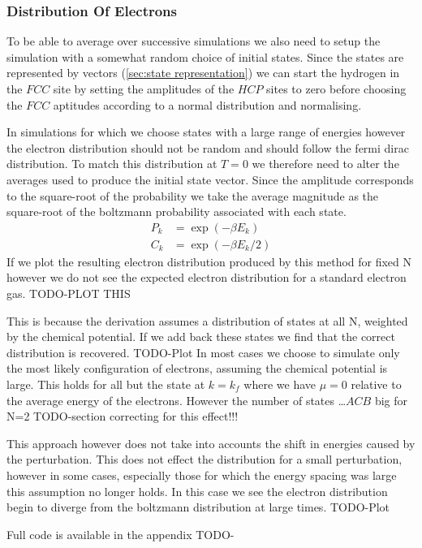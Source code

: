\subsubsection{Distribution Of Electrons}
To be able to average over successive
simulations we also need to setup the
simulation with a somewhat random
choice of initial states. Since the states
are represented by vectors (\cref{sec:state representation})
we can start the hydrogen
in the \(FCC\) site by setting the
amplitudes of the \(HCP\) sites to zero
before choosing the \(FCC\) aptitudes according to
a normal distribution and normalising.

In simulations for which we choose states
with a large range of energies however
the electron distribution should not be
random and should follow the fermi dirac distribution.
To match this distribution at \(T=0\) we therefore
need to alter the averages used
to produce the initial state vector.
Since the amplitude corresponds to
the square-root of the probability we
take the average magnitude as the
square-root of the boltzmann probability
associated with each state.
\begin{align}
    P_k & = \exp(-\beta{}E_k)     \\
    C_k & = \exp(-\beta{}E_k / 2)
\end{align}
If we plot the resulting
electron distribution produced
by this method for fixed N however
we do not see the expected electron
distribution for a standard electron
gas.
TODO-PLOT THIS

This is because the
derivation assumes a distribution
of states at all N, weighted by the
chemical potential. If we add back
these states we find that the correct
distribution is recovered.
TODO-Plot
In most cases we choose to
simulate only the most
likely configuration of electrons,
assuming the chemical potential is large.
This holds for all but the state at
\(k = k_f\) where we have \(\mu = 0\)
relative to the average energy of the
electrons. However the number of
states \ldots \(ACB\) big for N=2
TODO-section correcting for this effect!!!


This approach however does not take
into accounts the shift in energies
caused by the perturbation. This
does not effect the distribution
for a small perturbation,
however in some cases,
especially those for which the energy
spacing was large this assumption
no longer holds. In this case
we see the electron distribution
begin to diverge from the
boltzmann distribution at large times.
TODO-Plot


Full code is available in the appendix TODO-






